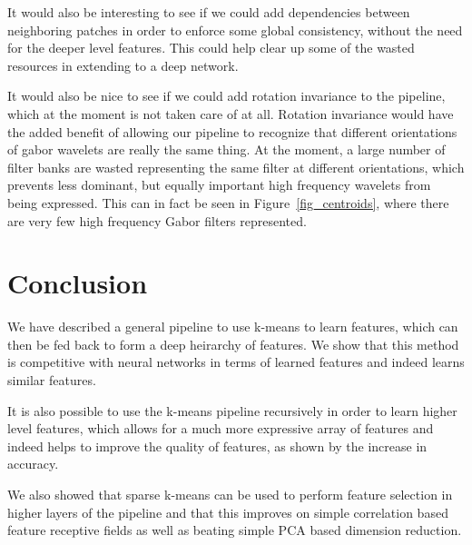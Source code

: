 \documentclass{article} %
\begin{document}
It would also be interesting to see if we could add dependencies between neighboring patches in order to enforce some global consistency, without the need for the deeper level features. This could help clear up some of the wasted resources in extending to a deep network.

It would also be nice to see if we could add rotation invariance to the pipeline, which at the moment is not taken care of at all. Rotation invariance would have the added benefit of allowing our pipeline to recognize that different orientations of gabor wavelets are really the same thing. At the moment, a large number of filter banks are wasted representing the same filter at different orientations, which prevents less dominant, but equally important high frequency wavelets from being expressed. This can in fact be seen in Figure~\ref{fig_centroids}, where there are very few high frequency Gabor filters represented.

\section{Conclusion}

We have described a general pipeline to use k-means to learn features, which can then be fed back to form a deep heirarchy of features. We show that this method is competitive with neural networks in terms of learned features and indeed learns similar features.

It is also possible to use the k-means pipeline recursively in order to learn higher level features, which allows for a much more expressive array of features and indeed helps to improve the quality of features, as shown by the increase in accuracy.

We also showed that sparse k-means can be used to perform feature selection in higher layers of the pipeline and that this improves on simple correlation based feature receptive fields as well as beating simple PCA based dimension reduction.



\end{document}
